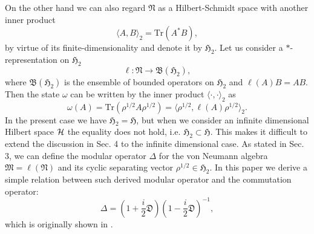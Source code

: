 On the other hand we can also regard $\mathfrak{N}$ as a Hilbert-Schmidt space with another inner product
$$
\langle A, B \rangle_2 =\mbox{Tr}(A^{\ast}B),
$$
by virtue of its finite-dimensionality and denote it by $\mathfrak{H}_2$.
Let us consider a $\ast$-representation on $\mathfrak{H}_2$
\begin{equation}\label{star-rep}
\ell :\mathfrak{N}\to \mathfrak{B}(\mathfrak{H}_2),
\end{equation}
where $\mathfrak{B}(\mathfrak{H}_2)$ is the ensemble of bounded operators on $\mathfrak{H}_2$
and $\ell(A)B=AB$.
Then the state $\omega$ can be written by the inner product $\langle \cdot, \cdot\rangle_2$ as 
$$
\omega(A)=\mbox{Tr}(\rho^{1/2}A\rho^{1/2})=\langle \rho^{1/2},\ell(A)\rho^{1/2}\rangle_2 .
$$
In the present case we have $\mathfrak{H}_2=\mathfrak{H}$, but when we consider an infinite
dimensional Hilbert space ${\cal H}$ the equality does not hold, i.e. $\mathfrak{H}_2\subset \mathfrak{H}$. This makes it difficult to extend the discussion in Sec. 4 to the infinite dimensional case.
As stated in Sec. 3,  we can define the
modular operator $\Delta$ for the von Neumann algebra $\mathfrak{M}=\ell(\mathfrak{N})$ and its cyclic separating vector $\rho^{1/2} \in \mathfrak{H}_2$. 
In this paper we derive a simple relation between such derived modular operator and the commutation operator:
$$
    \Delta=\left(1+\frac{i}{2}\mathfrak{D}\right)\left(1-\frac{i}{2}\mathfrak{D}\right)^{-1},
$$
which is originally shown in \cite{Holevo_1977}.
